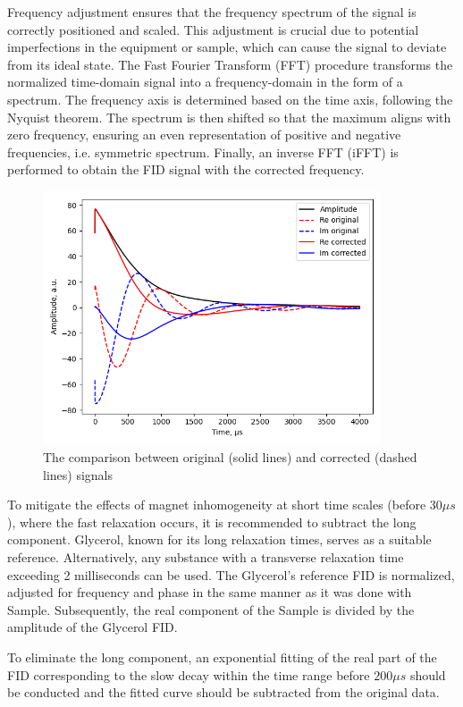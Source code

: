 \documentclass[a4paper,12pt]{article}
\begin{document}
Frequency adjustment ensures that the frequency spectrum of the signal is correctly positioned and scaled.
This adjustment is crucial due to potential imperfections in the equipment or sample, which can cause the signal to deviate from its ideal state. 
The Fast Fourier Transform (FFT) procedure transforms the normalized time-domain signal into a frequency-domain in the form of a spectrum. 
The frequency axis is determined based on the time axis, following the Nyquist theorem. 
The spectrum is then shifted so that the maximum aligns with zero frequency, ensuring an even representation of positive and negative frequencies, i.e. symmetric spectrum. 
Finally, an inverse FFT (iFFT) is performed to obtain the FID signal with the corrected frequency.

\begin{figure}[H]
  \centering
  \includegraphics[width=10cm]{images/Original_Corrected_FID.png}
  \caption{The comparison between original (solid lines) and corrected (dashed lines) signals}
  \label{fig:Original_Corrected_FID}
\end{figure}

To mitigate the effects of magnet inhomogeneity at short time scales (before $30 \mu s$), where the fast relaxation occurs, it is recommended to subtract the long component. 
Glycerol, known for its long relaxation times, serves as a suitable reference. 
Alternatively, any substance with a transverse relaxation time exceeding 2 milliseconds can be used. 
The Glycerol's reference FID is normalized, adjusted for frequency and phase in the same manner as it was done with Sample. 
Subsequently, the real component of the Sample is divided by the amplitude of the Glycerol FID.

To eliminate the long component, an exponential fitting of the real part of the FID corresponding to the slow decay within the time range before $200 \mu s$ should be conducted and the fitted curve should be subtracted from the original data.
\end{document}
